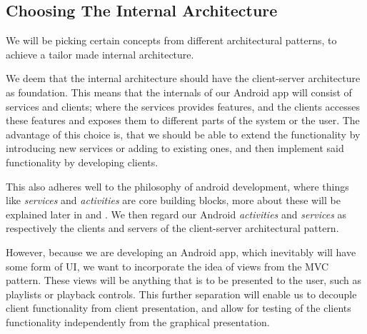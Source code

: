 \subsection{Choosing The Internal Architecture}
We will be picking certain concepts from different architectural patterns, to achieve a tailor made internal architecture.

We deem that the internal architecture should have the client-server architecture as foundation.
This means that the internals of our Android app will consist of services and clients;
where the services provides features, and the clients accesses these features and exposes them to different parts of the system or the user.
The advantage of this choice is, that we should be able to extend the functionality by introducing new services or adding to existing ones, and then implement said functionality by developing clients.

This also adheres well to the philosophy of android development, where things like \textit{services} and \textit{activities} are core building blocks, more about these will be explained later in  and .
We then regard our Android \textit{activities} and \textit{services} as respectively the clients and servers of the client-server architectural pattern.

However, because we are developing an Android app, which inevitably will have some form of \ac{UI}, we want to incorporate the idea of views from the \ac{MVC} pattern.
These views will be anything that is to be presented to the user, such as playlists or playback controls.
This further separation will enable us to decouple client functionality from client presentation, and allow for testing of the clients functionality independently from the graphical presentation.

